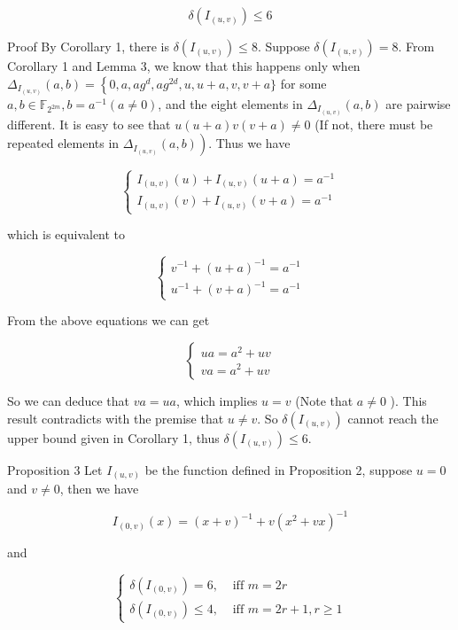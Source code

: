 \documentclass[10pt]{article}
\begin{document}
$$
\delta\left(I_{(u, v)}\right) \leq 6
$$

Proof By Corollary 1, there is $\delta\left(I_{(u, v)}\right) \leq 8$. Suppose $\delta\left(I_{(u, v)}\right)=8$. From Corollary 1 and Lemma 3, we know that this happens only when $\Delta_{I_{(u, v)}}(a, b)=\left\{0, a, a g^{d}, a g^{2 d}, u, u+\right. a, v, v+a\}$ for some $a, b \in \mathbb{F}_{2^{2 m}}, b=a^{-1}(a \neq 0)$, and the eight elements in $\Delta_{I_{(u, v)}}(a, b)$ are pairwise different. It is easy to see that $u(u+a) v(v+a) \neq 0$ (If not, there must be repeated elements in $\left.\Delta_{I_{(u, v)}}(a, b)\right)$. Thus we have

$$
\left\{\begin{array}{l}
I_{(u, v)}(u)+I_{(u, v)}(u+a)=a^{-1} \\
I_{(u, v)}(v)+I_{(u, v)}(v+a)=a^{-1}
\end{array}\right.
$$

which is equivalent to

$$
\left\{\begin{array}{l}
v^{-1}+(u+a)^{-1}=a^{-1} \\
u^{-1}+(v+a)^{-1}=a^{-1}
\end{array}\right.
$$

From the above equations we can get

$$
\left\{\begin{array}{l}
u a=a^{2}+u v \\
v a=a^{2}+u v
\end{array}\right.
$$

So we can deduce that $v a=u a$, which implies $u=v$ (Note that $a \neq 0$ ). This result contradicts with the premise that $u \neq v$. So $\delta\left(I_{(u, v)}\right)$ cannot reach the upper bound given in Corollary 1, thus $\delta\left(I_{(u, v)}\right) \leq 6$.

Proposition 3 Let $I_{(u, v)}$ be the function defined in Proposition 2, suppose $u=0$ and $v \neq 0$, then we have


\begin{equation*}
I_{(0, v)}(x)=(x+v)^{-1}+v\left(x^{2}+v x\right)^{-1} \tag{6}
\end{equation*}


and

\[
\begin{cases}\delta\left(I_{(0, v)}\right)=6, & \text { iff } m=2 r  \tag{7}\\ \delta\left(I_{(0, v)}\right) \leq 4, & \text { iff } m=2 r+1, r \geq 1\end{cases}
\]
\end{document}
